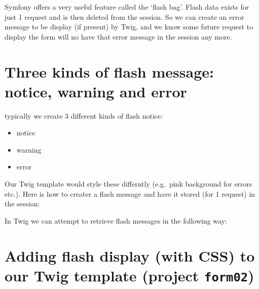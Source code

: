 \documentclass[a4paperpaper,openright]{book}
\newenvironment{Shaded}{}{}
\newcommand{\KeywordTok}[1]{\textcolor[rgb]{0.00,0.44,0.13}{\textbf{#1}}}
\newcommand{\NormalTok}[1]{#1}
\newcommand{\OtherTok}[1]{\textcolor[rgb]{0.00,0.44,0.13}{#1}}
\newcommand{\StringTok}[1]{\textcolor[rgb]{0.25,0.44,0.63}{#1}}
\providecommand{\tightlist}{%
  \setlength{\itemsep}{0pt}\setlength{\parskip}{0pt}}
\begin{document}
Symfony offers a very useful feature called the `flash bag'. Flash data
exists for just 1 request and is then deleted from the session. So we
can create an error message to be display (if present) by Twig, and we
know some future request to display the form will no have that error
message in the session any more.

\hypertarget{three-kinds-of-flash-message-notice-warning-and-error}{%
\section{Three kinds of flash message: notice, warning and
error}\label{three-kinds-of-flash-message-notice-warning-and-error}}

typically we create 3 different kinds of flash notice:

\begin{itemize}
\tightlist
\item
  notice
\item
  warning
\item
  error
\end{itemize}

Our Twig template would style these differntly (e.g.~pink background for
errors etc.). Here is how to creater a flash message and have it stored
(for 1 request) in the session:

\begin{Shaded}
\end{Shaded}

In Twig we can attempt to retrieve flash messages in the following way:

\begin{Shaded}
\end{Shaded}

\hypertarget{adding-flash-display-with-css-to-our-twig-template-project-form02}{%
\section{\texorpdfstring{Adding flash display (with CSS) to our Twig
template (project
\texttt{form02})}{Adding flash display (with CSS) to our Twig template (project form02)}}\label{adding-flash-display-with-css-to-our-twig-template-project-form02}}
\end{document}

